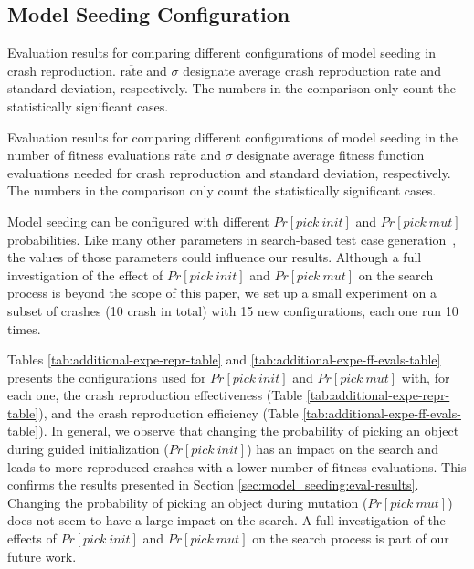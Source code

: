\subsection{Model Seeding Configuration}

\begin{table}[t]
	\center
	\caption{Evaluation results for comparing different configurations of model seeding in crash reproduction. $\overline{\text{rate}}$ and $\sigma$  designate average crash reproduction rate and standard deviation, respectively. The numbers in the comparison only count the statistically significant cases.}
	\label{tab:additional-expe-repr-table}
    \begin{footnotesize}
	
    \end{footnotesize}
\end{table}

\begin{table*} [t]
	\center
	\caption{Evaluation results for comparing different configurations of model seeding in the number of fitness evaluations $\overline{\text{rate}}$ and $\sigma$  designate average fitness function evaluations needed for crash reproduction and standard deviation, respectively. The numbers in the comparison only count the statistically significant cases.}
	\label{tab:additional-expe-ff-evals-table}
	\begin{footnotesize}
	
	\end{footnotesize}
\end{table*}

Model seeding can be configured with different $Pr[pick\ init]$ and $Pr[pick\ mut]$ probabilities. Like many other parameters in search-based test case generation~\cite{Arcuri2013}, the values of those parameters could influence our results.
Although a full investigation of the effect of $Pr[pick\ init]$ and $Pr[pick\ mut]$ on the search process is beyond the scope of this paper, we set up a small experiment on a subset of crashes (10 crash in total) with 15 new configurations, each one run 10 times.

Tables \ref{tab:additional-expe-repr-table} and \ref{tab:additional-expe-ff-evals-table} presents the configurations used for $Pr[pick\ init]$ and $Pr[pick\ mut]$ with, for each one, the crash reproduction effectiveness (Table \ref{tab:additional-expe-repr-table}), and the crash reproduction efficiency (Table \ref{tab:additional-expe-ff-evals-table}). In general, we observe that changing the probability of picking an object during guided initialization ($Pr[pick\ init]$) has an impact on the search and leads to more reproduced crashes with a lower number of fitness evaluations. This confirms the results presented in Section \ref{sec:model_seeding:eval-results}.
Changing the probability of picking an object during mutation ($Pr[pick\ mut]$) does not seem to have a large impact on the search.
A full investigation of the effects of $Pr[pick\ init]$ and $Pr[pick\ mut]$ on the search process is part of our future work.



